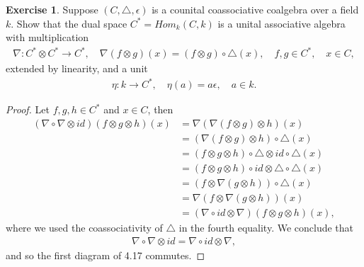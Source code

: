 \documentclass[8pt]{extarticle}
\newcommand{\<}{\langle}
\renewcommand{\>}{\rangle}
\theoremstyle{definition}
\newtheorem{exercise}{Exercise}
\begin{document}
\begin{exercise}
  Suppose $(C, \triangle, \epsilon)$ is a counital coassociative coalgebra over a field $k$. Show that the dual space $C^* = Hom_k(C,k)$ is a unital associative algebra with multiplication
  \begin{align*}
    \nabla: C^* \otimes C^* \to C^*, \quad \nabla(f \otimes g)(x) = (f \otimes g) \circ \triangle(x), \quad f, g \in C^*, \quad x \in C,
  \end{align*}
  extended by linearity, and a unit
  \begin{align*}
    \eta: k \to C^* , \quad \eta(a) = a\epsilon, \quad a \in k.
  \end{align*}
\end{exercise}
\begin{proof}
  Let $f,g,h \in C^*$ and $x \in C$, then 
  \begin{align*}
    (\nabla \circ \nabla \otimes id)(f \otimes g \otimes h)(x)
    &= \nabla(\nabla(f \otimes g) \otimes h)(x)\\
    &= (\nabla(f \otimes g) \otimes h) \circ \triangle(x)\\
    &= (f \otimes g \otimes h) \circ \triangle \otimes id \circ \triangle(x)\\
    &= (f \otimes g \otimes h) \circ id \otimes \triangle \circ \triangle(x)\\
    &= (f \otimes \nabla(g \otimes h))\circ \triangle(x)\\
    &= \nabla(f \otimes \nabla(g \otimes h))(x) \\
    &= (\nabla\circ id \otimes \nabla)(f \otimes g \otimes h)(x),    
  \end{align*}
  where we used the coassociativity of $\triangle$ in the fourth equality. We conclude that
  \begin{align*}
    \nabla \circ \nabla \otimes id = \nabla\circ id \otimes \nabla,
  \end{align*}
  and so the first diagram of 4.17 commutes.


\end{proof}
\end{document}
